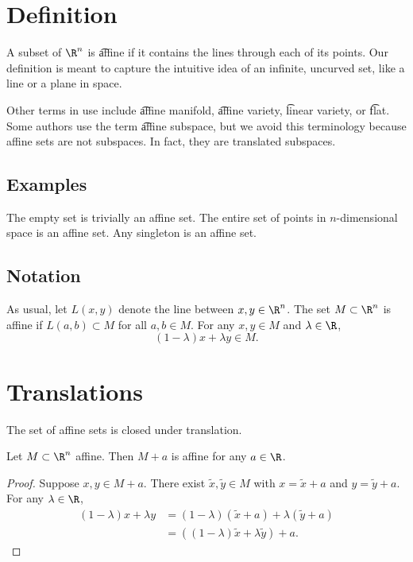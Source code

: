 
\section*{Definition}

A subset of $\R ^n$ is \t{affine} if it contains the lines through each of its points.
Our definition is meant to capture the intuitive idea of an infinite, uncurved set, like a line or a plane in space.

Other terms in use include \t{affine manifold}, \t{affine variety}, \t{linear variety}, or \t{flat}.
Some authors use the term \t{affine subspace}, but we avoid this terminology because affine sets are not subspaces.
In fact, they are translated subspaces.

\subsection*{Examples}

The empty set is trivially an affine set.
The entire set of points in $n$-dimensional space is an affine set.
Any singleton is an affine set.

\subsection*{Notation}

As usual, let $L(x, y)$ denote the line between $x, y \in \R ^n$.
The set $M \subset \R ^n$ is affine if $L(a, b) \subset M$ for all $a, b \in M$.
For any $x, y \in M$ and $\lambda  \in \R $,
\[
(1-\lambda )x + \lambda y \in M.
\]

\section*{Translations}

The set of affine sets is closed under translation.
\begin{proposition}
Let $M \subset \R ^n$ affine.
Then $M + a$ is affine for any $a \in \R $.
\begin{proof}Suppose $x, y \in M+a$.
There exist $\tilde{x}, \tilde{y} \in M$ with $x = \tilde{x} + a$ and $y = \tilde{y} + a$.
For any $\lambda  \in \R $,
\[
\begin{aligned}
(1-\lambda )x + \lambda y & = (1-\lambda )(\tilde{x} + a) + \lambda (\tilde{y} + a) \\
&= ((1-\lambda )\tilde{x} + \lambda \tilde{y}) + a.
\end{aligned}
\]\end{proof}
\end{proposition}


